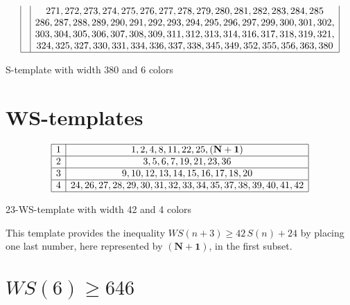 \documentclass[final,onefignum,onetabnum]{siamart190516}
\newcommand{\WS}{\mathit{WS}}
\begin{document}
\begin{table}[H]
\begin{small}
\[\begin{array}{|*{2}{c|}}
	& 271, 272, 273, 274, 275, 276, 277, 278, 279, 280, 281, 282, 283, 284, 285\\
	& 286, 287, 288, 289, 290, 291, 292, 293, 294, 295, 296, 297, 299, 300, 301, 302,\\
	& 303, 304, 305, 306, 307, 308, 309, 311, 312, 313, 314, 316, 317, 318, 319, 321,\\
	& 324, 325, 327, 330, 331, 334, 336, 337, 338, 345, 349, 352, 355, 356, 363, 380\\
	\hline
\end{array}
\]
\end{small}
\vspace{-3ex}
\caption{S-template with width 380 and 6 colors}
\vspace{-2ex}
\end{table}

\section{WS-templates}
\label{WS-templates}

\vspace{-1.5ex}

\begin{table}[H]
\renewcommand{\arraystretch}{1.05}
\begin{small}
\[
\begin{array}{|*{2}{c|}}
	\hline
	1 & 1, 2, 4, 8, 11, 22, 25, \mathbf{(N+1)}\\
	\hline
	2 & 3, 5, 6, 7, 19, 21, 23, 36\\
	\hline
	3 & 9, 10, 12, 13, 14, 15, 16, 17, 18, 20\\
	\hline
	4 & 24, 26, 27, 28, 29, 30, 31, 32, 33, 34, 35, 37, 38, 39, 40, 41, 42\\
	\hline
\end{array}
\]
\end{small}
\vspace{-3ex}
\caption{23-WS-template with width 42 and 4 colors}
\vspace{-1ex}
\end{table}

This template provides the inequality \(\WS (n+3) \geqslant 42 \, S(n) + 24\)
by placing one last number, here represented by \(\mathbf{(N+1)}\), in the first subset.


\section{\(\WS(6) \geqslant 646\)}
\label{WS(6)}
\end{document}
